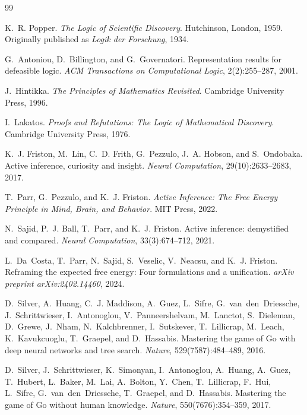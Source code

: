 \documentclass{article}
\begin{document}
\begin{thebibliography}{99}

K.~R. Popper.
\newblock \emph{The Logic of Scientific Discovery}.
\newblock Hutchinson, London, 1959.
\newblock Originally published as \emph{Logik der Forschung}, 1934.

G.~Antoniou, D.~Billington, and G.~Governatori.
\newblock Representation results for defeasible logic.
\newblock \emph{ACM Transactions on Computational Logic}, 2(2):255--287, 2001.
 
J.~Hintikka.
\newblock \emph{The Principles of Mathematics Revisited}.
\newblock Cambridge University Press, 1996.
 
I.~Lakatos.
\newblock \emph{Proofs and Refutations: The Logic of Mathematical Discovery}.
\newblock Cambridge University Press, 1976.

K.~J. Friston, M.~Lin, C.~D. Frith, G.~Pezzulo, J.~A. Hobson, and S.~Ondobaka.
\newblock Active inference, curiosity and insight.
\newblock \emph{Neural Computation}, 29(10):2633--2683, 2017.

T.~Parr, G.~Pezzulo, and K.~J. Friston.
\newblock \emph{Active Inference: The Free Energy Principle in Mind, Brain, and Behavior}.
\newblock MIT Press, 2022.

N.~Sajid, P.~J. Ball, T.~Parr, and K.~J. Friston.
\newblock Active inference: demystified and compared.
\newblock \emph{Neural Computation}, 33(3):674--712, 2021.

L.~Da~Costa, T.~Parr, N.~Sajid, S.~Veselic, V.~Neacsu, and K.~J. Friston.
\newblock Reframing the expected free energy: Four formulations and a unification.
\newblock \emph{arXiv preprint arXiv:2402.14460}, 2024.

D.~Silver, A.~Huang, C.~J. Maddison, A.~Guez, L.~Sifre, G.~van~den~Driessche, J.~Schrittwieser, I.~Antonoglou, V.~Panneershelvam, M.~Lanctot, S.~Dieleman, D.~Grewe, J.~Nham, N.~Kalchbrenner, I.~Sutskever, T.~Lillicrap, M.~Leach, K.~Kavukcuoglu, T.~Graepel, and D.~Hassabis.
\newblock Mastering the game of {G}o with deep neural networks and tree search.
\newblock \emph{Nature}, 529(7587):484--489, 2016.

D.~Silver, J.~Schrittwieser, K.~Simonyan, I.~Antonoglou, A.~Huang, A.~Guez, T.~Hubert, L.~Baker, M.~Lai, A.~Bolton, Y.~Chen, T.~Lillicrap, F.~Hui, L.~Sifre, G.~van~den~Driessche, T.~Graepel, and D.~Hassabis.
\newblock Mastering the game of {G}o without human knowledge.
\newblock \emph{Nature}, 550(7676):354--359, 2017.


\end{thebibliography}
\end{document}
